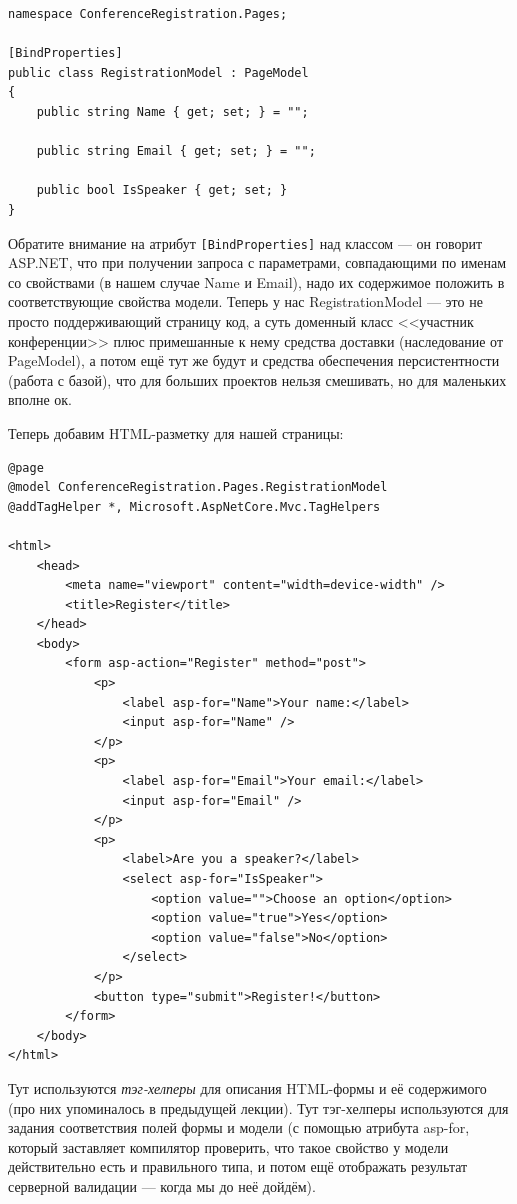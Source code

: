 \documentclass{../../text-style}
\begin{document}
\begin{verbatim}
namespace ConferenceRegistration.Pages;

[BindProperties]
public class RegistrationModel : PageModel
{
    public string Name { get; set; } = "";

    public string Email { get; set; } = "";

    public bool IsSpeaker { get; set; }
}
\end{verbatim}

Обратите внимание на атрибут \texttt{[BindProperties]} над классом --- он говорит ASP.NET, что при получении запроса с параметрами, совпадающими по именам со свойствами (в нашем случае Name и Email), надо их содержимое положить в соответствующие свойства модели. Теперь у нас RegistrationModel --- это не просто поддерживающий страницу код, а суть доменный класс <<участник конференции>> плюс примешанные к нему средства доставки (наследование от PageModel), а потом ещё тут же будут и средства обеспечения персистентности (работа с базой), что для больших проектов нельзя смешивать, но для маленьких вполне ок.

Теперь добавим HTML-разметку для нашей страницы:

\begin{verbatim}
@page
@model ConferenceRegistration.Pages.RegistrationModel
@addTagHelper *, Microsoft.AspNetCore.Mvc.TagHelpers

<html>
    <head>
        <meta name="viewport" content="width=device-width" />
        <title>Register</title>
    </head>
    <body>
        <form asp-action="Register" method="post">
            <p>
                <label asp-for="Name">Your name:</label>
                <input asp-for="Name" />
            </p>
            <p>
                <label asp-for="Email">Your email:</label>
                <input asp-for="Email" />
            </p>
            <p>
                <label>Are you a speaker?</label>
                <select asp-for="IsSpeaker">
                    <option value="">Choose an option</option>
                    <option value="true">Yes</option>
                    <option value="false">No</option>
                </select>
            </p>
            <button type="submit">Register!</button>
        </form>
    </body>
</html>
\end{verbatim}

Тут используются \emph{тэг-хелперы} для описания HTML-формы и её содержимого (про них упоминалось в предыдущей лекции). Тут тэг-хелперы используются для задания соответствия полей формы и модели (с помощью атрибута asp-for, который заставляет компилятор проверить, что такое свойство у модели действительно есть и правильного типа, и потом ещё отображать результат серверной валидации --- когда мы до неё дойдём).
\end{document}
